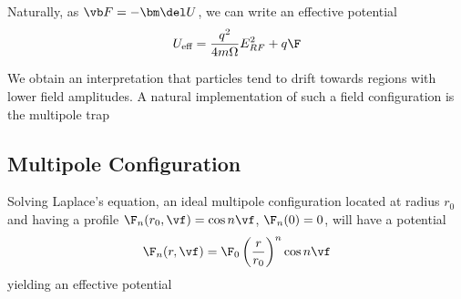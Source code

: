 \documentclass[12pt]{article}
\begin{document}
Naturally, as \( \vb F=-\bm\del U \), we can write an effective potential
\[ U_\text{eff}=\frac{q^2}{4m\Omega}E_{RF}^2+q\F \]

We obtain an interpretation that particles tend to drift towards regions with lower field amplitudes. A natural implementation of such a field configuration is the multipole trap

\subsection{Multipole Configuration}
Solving Laplace's equation, an ideal multipole configuration located at radius \( r_0 \) and having a profile \( \F_n(r_0,\vf)=\cos n\vf \), \( \F_n(0)=0 \), will have a potential
\[ \F_n(r,\vf)=\F_0 \left(  \frac{r}{r_0}\right)^n\cos n\vf \]
yielding an effective potential 
\end{document}
